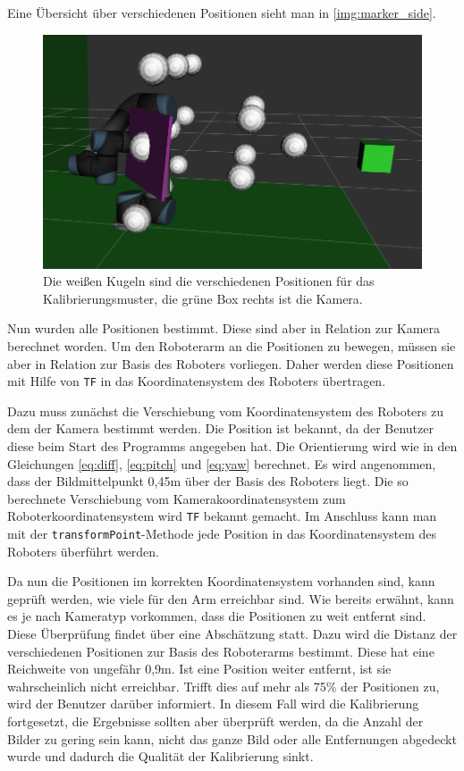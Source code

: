 Eine Übersicht über verschiedenen Positionen sieht man in \autoref{img:marker_side}.
\begin{figure}
\centering
\includegraphics[width=\textwidth]{images/marker_side.png}
\caption{Die weißen Kugeln sind die verschiedenen Positionen für das Kalibrierungsmuster, die grüne Box rechts ist die Kamera.}\label{img:marker_side}
\end{figure}


Nun wurden alle Positionen bestimmt. Diese sind aber in Relation zur Kamera berechnet worden. Um den Roboterarm an die Positionen zu bewegen, müssen sie aber in Relation zur Basis des Roboters vorliegen. Daher werden diese Positionen mit Hilfe von \texttt{TF} in das Koordinatensystem des Roboters übertragen.

Dazu muss zunächst die Verschiebung vom Koordinatensystem des Roboters zu dem der Kamera bestimmt werden. Die Position ist bekannt, da der Benutzer diese beim Start des Programms angegeben hat. Die Orientierung wird wie in den Gleichungen \autoref{eq:diff}, \autoref{eq:pitch} und \autoref{eq:yaw} berechnet. Es wird angenommen, dass der Bildmittelpunkt 0,45m über der Basis des Roboters liegt. Die so berechnete Verschiebung vom Kamerakoordinatensystem zum Roboterkoordinatensystem wird \texttt{TF} bekannt gemacht. Im Anschluss kann man mit der \texttt{transformPoint}-Methode jede Position in das Koordinatensystem des Roboters überführt werden.

Da nun die Positionen im korrekten Koordinatensystem vorhanden sind, kann geprüft werden, wie viele für den Arm erreichbar sind. Wie bereits erwähnt, kann es je nach Kameratyp vorkommen, dass die Positionen zu weit entfernt sind. Diese Überprüfung findet über eine Abschätzung statt. Dazu wird die Distanz der verschiedenen Positionen zur Basis des Roboterarms bestimmt. Diese hat eine Reichweite von ungefähr 0,9m. Ist eine Position weiter entfernt, ist sie wahrscheinlich nicht erreichbar. Trifft dies auf mehr als 75\% der Positionen zu, wird der Benutzer darüber informiert. In diesem Fall wird die Kalibrierung fortgesetzt, die Ergebnisse sollten aber überprüft werden, da die Anzahl der Bilder zu gering sein kann, nicht das ganze Bild oder alle Entfernungen abgedeckt wurde und dadurch die Qualität der Kalibrierung sinkt.

